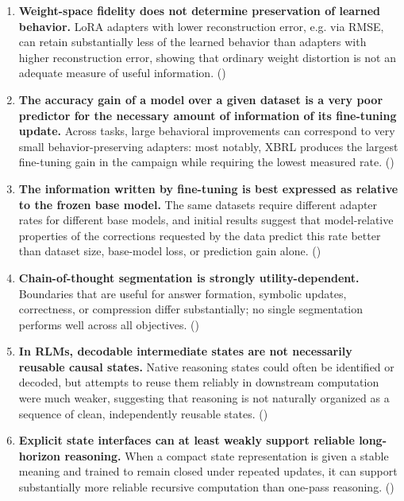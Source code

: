 \begin{enumerate}[leftmargin=*]

    \item \textbf{Weight-space fidelity does not determine preservation of learned behavior.}
    LoRA adapters with lower reconstruction error, e.g. via RMSE, can retain substantially less of the learned behavior than adapters with higher reconstruction error, showing that ordinary weight distortion is not an adequate measure of useful information.
    ()

    \item \textbf{The accuracy gain of a model over a given dataset is a very poor predictor for the necessary amount of information of its fine-tuning update.}
    Across tasks, large behavioral improvements can correspond to very small behavior-preserving adapters: most notably, XBRL produces the largest fine-tuning gain in the campaign while requiring the lowest measured rate.
    ()

    \item \textbf{The information written by fine-tuning is best expressed as relative to the frozen base model.}
    The same datasets require different adapter rates for different base models, and initial results suggest that model-relative properties of the corrections requested by the data predict this rate better than dataset size, base-model loss, or prediction gain alone.
    ()

    \item \textbf{Chain-of-thought segmentation is strongly utility-dependent.}
    Boundaries that are useful for answer formation, symbolic updates, correctness, or compression differ substantially; no single segmentation performs well across all objectives.
    ()

    \item \textbf{In RLMs, decodable intermediate states are not necessarily reusable causal states.}
    Native reasoning states could often be identified or decoded, but attempts to reuse them reliably in downstream computation were much weaker, suggesting that reasoning is not naturally organized as a sequence of clean, independently reusable states.
    ()

    \item \textbf{Explicit state interfaces can at least weakly support reliable long-horizon reasoning.}
    When a compact state representation is given a stable meaning and trained to remain closed under repeated updates, it can support substantially more reliable recursive computation than one-pass reasoning.
    ()

\end{enumerate}
